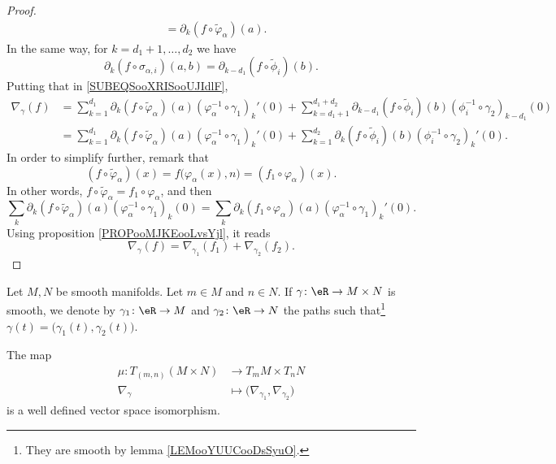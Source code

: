 \begin{proof}
\begin{subequations}
\begin{align}
			                                         & =\partial_k(f\circ \tilde \varphi_{\alpha})(a).
		\end{align}
	\end{subequations}
	In the same way, for \( k=d_1+1,\ldots,d_2\) we have
	\begin{equation}
		\partial_k(f\circ\sigma_{\alpha,i})(a,b)=\partial_{k-d_1}(f\circ\tilde \phi_i)(b).
	\end{equation}
	Putting that in \eqref{SUBEQSooXRISooUJIdlF},
	\begin{subequations}
		\begin{align}
			\nabla_{\gamma}(f) & =\sum_{k=1}^{d_1}\partial_k(f\circ\tilde \varphi_{\alpha})(a)(\varphi_{\alpha}^{-1}\circ\gamma_1)_k'(0)+\sum_{k=d_1+1}^{d_1+d_2}\partial_{k-d_1}(f\circ\tilde \phi_i)(b)(\phi_i^{-1}\circ\gamma_2)_{k-d_1}(0) \\
			                   & =\sum_{k=1}^{d_1}\partial_k(f\circ\tilde \varphi_{\alpha})(a)(\varphi_{\alpha}^{-1}\circ\gamma_1)_k'(0)+\sum_{k=1}^{d_2}\partial_k(f\circ\tilde \phi_i)(b)(\phi_i^{-1}\circ\gamma_2)_k'(0).
		\end{align}
	\end{subequations}
	In order to simplify further, remark that
	\begin{equation}
		(f\circ\tilde \varphi_{\alpha})(x)=f\big( \varphi_{\alpha}(x),n \big)=(f_1\circ\varphi_{\alpha})(x).
	\end{equation}
	In other words, \( f\circ\tilde \varphi_{\alpha}=f_1\circ\varphi_{\alpha}\), and then
	\begin{equation}
		\sum_k\partial_k(f\circ\tilde \varphi_{\alpha})(a)(\varphi_{\alpha}^{-1}\circ\gamma_1)_k(0)=
		\sum_k\partial_k(f_1\circ\varphi_{\alpha})(a)(\varphi_{\alpha}^{-1}\circ\gamma_1)_k'(0).
	\end{equation}
	Using proposition \ref{PROPooMJKEooLvsYjl}, it reads
	\begin{equation}
		\nabla_{\gamma}(f)=\nabla_{\gamma_1}(f_1)+\nabla_{\gamma_2}(f_2).
	\end{equation}
\end{proof}


\begin{proposition}	\label{PROPooPSELooDDwFru}
	Let \( M,N\) be smooth manifolds. Let \( m\in M\) and \( n\in N\). If \(\gamma \colon \eR\to M\times N  \) is smooth, we denote by \(\gamma_1 \colon \eR\to M  \) and \(\gamma_2 \colon \eR\to N  \) the paths such that\footnote{They are smooth by lemma \ref{LEMooYUUCooDsSyuO}.} \( \gamma(t)=\big( \gamma_1(t),\gamma_2(t) \big)\).

	The map
	\begin{equation}
		\begin{aligned}
			\mu\colon T_{(m,n)}(M\times N) & \to T_mM\times T_nN                                     \\
			\nabla_{\gamma}                & \mapsto \big( \nabla_{\gamma_1},\nabla_{\gamma_2} \big)
		\end{aligned}
	\end{equation}
	is a well defined vector space isomorphism.
\end{proposition}

